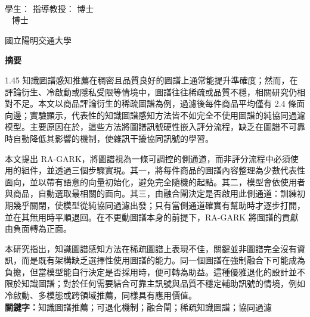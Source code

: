 \begin{center}
    \large
    \begin{singlespace}    
        \textbf{\chineseTitle{}} \\[0.5cm]
    \end{singlespace}

    \begin{singlespace}    
    學生：\studentCnName  \hspace{2.5cm}  指導教授：\advisorCnName \hspace{0.1cm} 博士 \\

    \ifdefined\advisorCnNameB %
        \hspace{9.6cm}  \advisorCnNameB ~ 博士 \\
    \fi
    \end{singlespace}

    \vspace{0.5cm}

    \begin{singlespace}
        國立陽明交通大學\NameofDepartmentInstituteCN\\[0.2cm]
    \end{singlespace}

    \textbf{摘\hspace{1cm}要} \\[0.5cm]

\end{center}

\normalsize

\begin{spacing}{1.45}
知識圖譜感知推薦在稠密且品質良好的圖譜上通常能提升準確度；然而，在評論衍生、冷啟動或隱私受限等情境中，圖譜往往稀疏或品質不穩，相關研究仍相對不足。本文以商品評論衍生的稀疏圖譜為例，過濾後每件商品平均僅有 2.4 條面向邊；實驗顯示，代表性的知識圖譜感知方法皆不如完全不使用圖譜的純協同過濾模型。主要原因在於，這些方法將圖譜訊號硬性嵌入評分流程，缺乏在圖譜不可靠時自動降低其影響的機制，使雜訊干擾協同訊號的學習。

本文提出 RA-GARK，將圖譜視為一條可調控的側通道，而非評分流程中必須使用的組件，並透過三個步驟實現。其一，將每件商品的圖譜內容整理為少數代表性面向，並以帶有語意的向量初始化，避免完全隨機的起點。其二，模型會依使用者與商品，自動選取最相關的面向。其三，由融合閘決定是否啟用此側通道：訓練初期幾乎關閉，使模型從純協同過濾出發；只有當側通道確實有幫助時才逐步打開，並在其無用時平順退回。在不更動圖譜本身的前提下，RA-GARK 將圖譜的貢獻由負面轉為正面。

本研究指出，知識圖譜感知方法在稀疏圖譜上表現不佳，關鍵並非圖譜完全沒有資訊，而是既有架構缺乏選擇性使用圖譜的能力。同一個圖譜在強制融合下可能成為負擔，但當模型能自行決定是否採用時，便可轉為助益。這種優雅退化的設計並不限於知識圖譜；對於任何需要結合可靠主訊號與品質不穩定輔助訊號的情境，例如冷啟動、多模態或跨領域推薦，同樣具有應用價值。\\[0.5\baselineskip]
\textbf{關鍵字：}知識圖譜推薦；可退化機制；融合閘；稀疏知識圖譜；協同過濾
\end{spacing}
